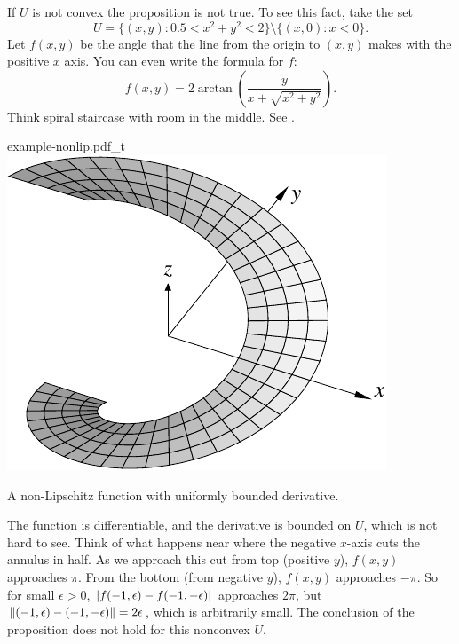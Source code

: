 \begin{example}
If $U$ is not convex the proposition is not true.  To see this fact, take
the set
\begin{equation*}
U = \bigl\{ (x,y) : 0.5 < x^2+y^2 < 2 \bigr\} \setminus \bigl\{ (x,0) : x <
0 \bigr\} .
\end{equation*}
Let $f(x,y)$ be the angle that the line from the origin to $(x,y)$
makes with the positive $x$ axis.  You can even write the formula for $f$:
\begin{equation*}
f(x,y) = 2 \operatorname{arctan}\left( \frac{y}{x+\sqrt{x^2+y^2}}\right) .
\end{equation*}
Think spiral staircase with room in the middle.  See
.

\begin{myfigureht}
{example-nonlip.pdf_t}
\qquad
\includegraphics{figures/nonlipgraph}
\caption{A non-Lipschitz function with uniformly bounded
derivative.\label{mv:fignonlip}}
\end{myfigureht}

The function is differentiable,
and the derivative is bounded on $U$, which is not hard to see.   Think of
what happens near where the negative $x$-axis cuts the annulus in half.
As we approach this cut from top (positive $y$), $f(x,y)$ approaches $\pi$.
From the bottom (from negative $y$), $f(x,y)$ approaches $-\pi$.
So for small $\epsilon > 0$, $\lvert {f(-1,\epsilon)-f(-1,-\epsilon)} \rvert$
approaches $2\pi$, but $\lVert {(-1,\epsilon)-(-1,-\epsilon)} \rVert = 2\epsilon$,
which is arbitrarily small.  The conclusion of the proposition does not
hold for this nonconvex $U$.
\end{example}

